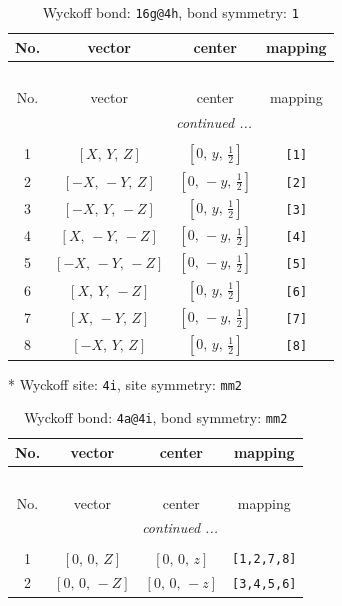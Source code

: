 \documentclass[fleqn,8pt]{jsarticle}
\begin{document}
\begin{longtable}{cccc}
\caption{Wyckoff bond: {\tt 16g@4h}, bond symmetry: {\tt 1}}
 \\
 \hline \hline
No. & vector & center & mapping \\ \hline \endfirsthead

\multicolumn{3}{l}{\tablename\ \thetable{}} \\
 \hline \hline
No. & vector & center & mapping \\ \hline \endhead

 \hline \hline
\multicolumn{3}{r}{\footnotesize\it continued ...} \\ \endfoot

 \hline \hline
\multicolumn{3}{r}{} \\ \endlastfoot

1 & $\left[ X,\, Y,\, Z \right]$ & $\left[ 0,\, y,\, \frac{1}{2} \right]$ & {\tt [1]} \\ \hline
2 & $\left[ - X,\, - Y,\, Z \right]$ & $\left[ 0,\, - y,\, \frac{1}{2} \right]$ & {\tt [2]} \\ \hline
3 & $\left[ - X,\, Y,\, - Z \right]$ & $\left[ 0,\, y,\, \frac{1}{2} \right]$ & {\tt [3]} \\ \hline
4 & $\left[ X,\, - Y,\, - Z \right]$ & $\left[ 0,\, - y,\, \frac{1}{2} \right]$ & {\tt [4]} \\ \hline
5 & $\left[ - X,\, - Y,\, - Z \right]$ & $\left[ 0,\, - y,\, \frac{1}{2} \right]$ & {\tt [5]} \\ \hline
6 & $\left[ X,\, Y,\, - Z \right]$ & $\left[ 0,\, y,\, \frac{1}{2} \right]$ & {\tt [6]} \\ \hline
7 & $\left[ X,\, - Y,\, Z \right]$ & $\left[ 0,\, - y,\, \frac{1}{2} \right]$ & {\tt [7]} \\ \hline
8 & $\left[ - X,\, Y,\, Z \right]$ & $\left[ 0,\, y,\, \frac{1}{2} \right]$ & {\tt [8]} \\
\end{longtable}
* Wyckoff site: {\tt 4i}, site symmetry: {\tt mm2}
\renewcommand{\arraystretch}{1.2}
\begin{longtable}{cccc}
\caption{Wyckoff bond: {\tt 4a@4i}, bond symmetry: {\tt mm2}}
 \\
 \hline \hline
No. & vector & center & mapping \\ \hline \endfirsthead

\multicolumn{3}{l}{\tablename\ \thetable{}} \\
 \hline \hline
No. & vector & center & mapping \\ \hline \endhead

 \hline \hline
\multicolumn{3}{r}{\footnotesize\it continued ...} \\ \endfoot

 \hline \hline
\multicolumn{3}{r}{} \\ \endlastfoot

1 & $\left[ 0,\, 0,\, Z \right]$ & $\left[ 0,\, 0,\, z \right]$ & {\tt [1,2,7,8]} \\ \hline
2 & $\left[ 0,\, 0,\, - Z \right]$ & $\left[ 0,\, 0,\, - z \right]$ & {\tt [3,4,5,6]} \\
\end{longtable}
\end{document}
